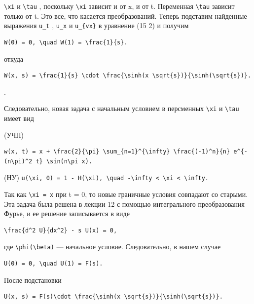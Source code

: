 \documentclass[
  ukrainian,
]{article}
\begin{document}
\texttt{\textbackslash{}xi} и \texttt{\textbackslash{}tau} , поскольку
\texttt{\textbackslash{}xi} зависит и от x, и от t. Переменная
\texttt{\textbackslash{}tau} зависит только от t. Это все, что касается
преобразований. Теперь подставим найденные выражения \texttt{u\_t} ,
\texttt{u\_x} и \texttt{u\_\{vx\}} в уравнение (15 2) и получим

\begin{verbatim}
W(0) = 0, \quad W(1) = \frac{1}{s}.
\end{verbatim}

откуда

\begin{verbatim}
W(x, s) = \frac{1}{s} \cdot \frac{\sinh(x \sqrt{s})}{\sinh(\sqrt{s})}.
\end{verbatim}

.

Следовательно, новая задача с начальным условием в персменных
\texttt{\textbackslash{}xi} и \texttt{\textbackslash{}tau} имеет вид

(УЧП)

\begin{verbatim}
w(x, t) = x + \frac{2}{\pi} \sum_{n=1}^{\infty} \frac{(-1)^n}{n} e^{-(n\pi)^2 t} \sin(n\pi x).
\end{verbatim}

(НУ)
\texttt{u(\textbackslash{}xi,\ 0)\ =\ 1\ -\ H(\textbackslash{}xi),\ \textbackslash{}quad\ -\textbackslash{}infty\ \textless{}\ \textbackslash{}xi\ \textless{}\ \textbackslash{}infty.}

Так как \texttt{\textbackslash{}xi\ =\ x} при t = 0, то новые граничные
условия совпадают со старыми. Эта задача была решена в лекции 12 с
помощью интегрального преобразования Фурье, и ее решение записывается в
виде

\begin{verbatim}
\frac{d^2 U}{dx^2} - s U(x) = 0,
\end{verbatim}

где \texttt{\textbackslash{}phi(\textbackslash{}beta)} --- начальное
условие. Следовательно, в нашем случае

\begin{verbatim}
U(0) = 0, \quad U(1) = F(s).
\end{verbatim}

После подстановки

\begin{verbatim}
U(x, s) = F(s)\cdot \frac{\sinh(x \sqrt{s})}{\sinh(\sqrt{s})}.
\end{verbatim}
\end{document}
